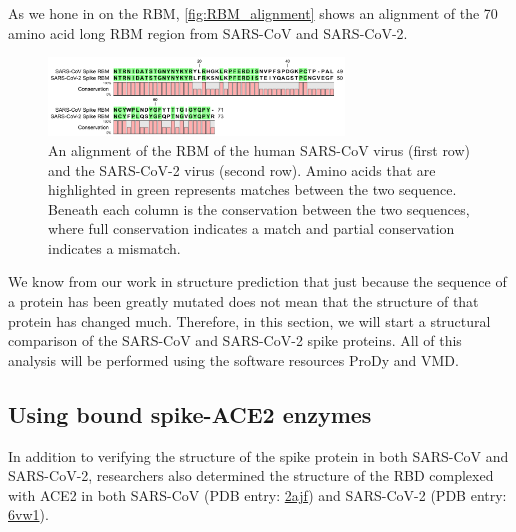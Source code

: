 As we hone in on the RBM, \autoref{fig:RBM_alignment} shows an alignment of the 70 amino acid long RBM region from SARS-CoV and SARS-CoV-2.\\

\begin{figure}[h]
	\centering
	\mySfFamily
	\includegraphics[width = 0.7\textwidth]{../images/RBM_alignment.png}
	\caption{An alignment of the RBM of the human SARS-CoV virus (first row) and the SARS-CoV-2 virus (second row). Amino acids that are highlighted in green represents matches between the two sequence. Beneath each column is the conservation between the two sequences, where full conservation indicates a match and partial conservation indicates a mismatch.}
	\label{fig:RBM_alignment}
\end{figure}

We know from our work in structure prediction that just because the sequence of a protein has been greatly mutated does not mean that the structure of that protein has changed much. Therefore, in this section, we will start a structural comparison of the SARS-CoV and SARS-CoV-2 spike proteins. All of this analysis will be performed using the software resources ProDy and VMD.

\FloatBarrier
{}
\subsection{Using bound spike-ACE2 enzymes}

In addition to verifying the structure of the spike protein in both SARS-CoV and SARS-CoV-2, researchers also determined the structure of the RBD complexed with ACE2 in both SARS-CoV (PDB entry: \href{https://www.rcsb.org/structure/2ajf}{2ajf}) and SARS-CoV-2 (PDB entry: \href{https://www.rcsb.org/structure/6vw1}{6vw1}).\\

\begin{note}\end{note}

